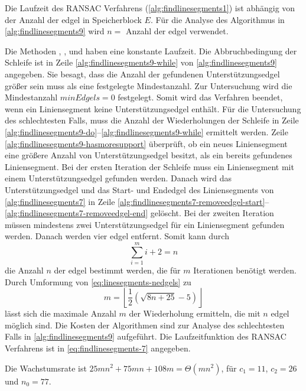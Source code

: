 Die Laufzeit des RANSAC Verfahrens (\autoref{alg:findlinesegments1}) ist abhängig von der Anzahl der \gls{edgel} in
 Speicherblock $E$. Für die Analyse des Algorithmus in \autoref{alg:findlinesegments9} wird $n = $ Anzahl der
 \gls{edgel} verwendet.

Die Methoden , ,  und 
 haben eine konstante Laufzeit. Die Abbruchbedingung der Schleife ist in Zeile \ref{alg:findlinesegments9-while} von
 \autoref{alg:findlinesegments9} angegeben. Sie besagt, dass die Anzahl der gefundenen Unterstützungsedgel größer sein
 muss als eine festgelegte Mindestanzahl. Zur Untersuchung wird die Mindestanzahl $\mathit{minEdgels} = 0$ festgelegt.
 Somit wird das Verfahren beendet, wenn ein Liniensegment keine Unterstützungsedgel enthält. Für die Untersuchung des
 schlechtesten Falls, muss die Anzahl der Wiederholungen der Schleife in Zeile
 \ref{alg:findlinesegments9-do}--\ref{alg:findlinesegments9-while} ermittelt werden. Zeile
 \ref{alg:findlinesegments9-hasmoresupport} überprüft, ob ein neues Liniensegment eine größere Anzahl von
 Unterstützungsedgel besitzt, als ein bereits gefundenes Liniensegment. Bei der ersten Iteration der Schleife muss
 ein Liniensegment mit einem Unterstützungsedgel gefunden werden. Danach wird das Unterstützungsedgel und das Start-
 und Endedgel des Liniensegments von \autoref{alg:findlinesegments7} in Zeile
 \ref{alg:findlinesegments7-removeedgel-start}--\ref{alg:findlinesegments7-removeedgel-end} gelöscht. Bei der zweiten
 Iteration müssen mindestens zwei Unterstützungsedgel für ein Liniensegment gefunden werden. Danach werden vier
 \gls{edgel} entfernt. Somit kann durch
\begin{equation}
\label{eq:linesegments-nedgels}
\sum_{i=1}^{m} i + 2 = n
\end{equation}
die Anzahl $n$ der \gls{edgel} bestimmt werden, die für $m$ Iterationen benötigt werden. Durch Umformung von \autoref{eq:linesegments-nedgels} zu
\begin{equation}
\label{eq:linesegments-miteration}
m = \left\lfloor\frac{1}{2}(\sqrt{8n+25} - 5)\right\rfloor
\end{equation}
lässt sich die maximale Anzahl $m$ der Wiederholung ermitteln, die mit $n$ \gls{edgel} möglich sind. %
Die Kosten der  Algorithmen sind zur Analyse des schlechtesten Falls in \autoref{alg:findlinesegments9} aufgeführt. Die
 Laufzeitfunktion des RANSAC Verfahrens ist in \autoref{eq:findlinesegments-7} angegeben.

Die Wachstumsrate ist $25mn^2 + 75mn + 108m = \Theta(mn^2)$, für $c_{1} = 11$, $c_{2} = 26$ und $n_{0} = 77$.

